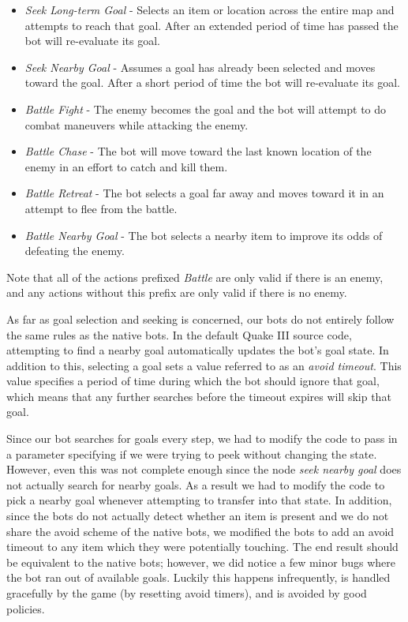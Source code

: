 \begin{itemize}
    \item \emph{Seek Long-term Goal} - Selects an item or location across the entire map and attempts to reach that goal. After an extended period of time has passed the bot will re-evaluate its goal.
    \item \emph{Seek Nearby Goal} - Assumes a goal has already been selected and moves toward the goal. After a short period of time the bot will re-evaluate its goal.
    \item \emph{Battle Fight} - The enemy becomes the goal and the bot will attempt to do combat maneuvers while attacking the enemy.
    \item \emph{Battle Chase} - The bot will move toward the last known location of the enemy in an effort to catch and kill them.
    \item \emph{Battle Retreat} - The bot selects a goal far away and moves toward it in an attempt to flee from the battle.
    \item \emph{Battle Nearby Goal} - The bot selects a nearby item to improve its odds of defeating the enemy.
\end{itemize}
Note that all of the actions prefixed \emph{Battle} are only valid if there is an enemy, and any actions without this prefix are only valid if there is no enemy.

As far as goal selection and seeking is concerned, our bots do not entirely follow the same rules as the native bots. In the default Quake III source code, attempting to find a nearby goal automatically updates the bot's goal state. In addition to this, selecting a goal sets a value referred to as an \emph{avoid timeout}. This value specifies a period of time during which the bot should ignore that goal, which means that any further searches before the timeout expires will skip that goal. 

Since our bot searches for goals every step, we had to modify the code to pass in a parameter specifying if we were trying to peek without changing the state. However, even this was not complete enough since the node \emph{seek nearby goal} does not actually search for nearby goals. As a result we had to modify the code to pick a nearby goal whenever attempting to transfer into that state. In addition, since the bots do not actually detect whether an item is present and we do not share the avoid scheme of the native bots, we modified the bots to add an avoid timeout to any item which they were potentially touching. The end result should be equivalent to the native bots; however, we did notice a few minor bugs where the bot ran out of available goals. Luckily this happens infrequently, is handled gracefully by the game (by resetting avoid timers), and is avoided by good policies.

